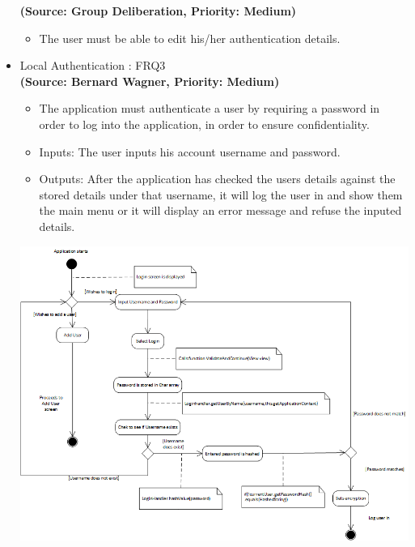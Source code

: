 \begin{itemize}
\textbf{(Source: Group Deliberation, Priority: Medium)}
\begin{itemize}
\item The user must be able to edit his/her authentication details.
\end{itemize}
\item{Local Authentication : FRQ3}\\%
\textbf{(Source: Bernard Wagner, Priority: Medium)}
\begin{itemize}
\item The application must authenticate a user by requiring a password in order to log into the application, in order to ensure confidentiality.
\item Inputs: The user inputs his account username and password.
\item Outputs: After the application has checked the users details against the stored details under that username, it will log the user in and show them the main menu or it will display an error message and refuse the inputed details.
\end{itemize}
 \includegraphics[width=13cm]{diagrams/StateDiagrams/LocalAuthenticationStateDiagram.png}
\end{itemize}
